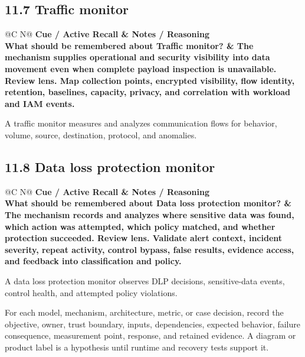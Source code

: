 \documentclass[11pt]{article}
\newcommand{\CornellHeader}{\rowcolor{Navy}\color{white}\bfseries Cue / Active Recall & \color{white}\bfseries Notes / Reasoning \\\endhead}
\newcommand{\CornellRow}[2]{\cellcolor{CueGray}\textbf{#1} & #2 \\\addlinespace[3pt]}
\begin{document}
\subsection{11.7 Traffic monitor}
\begin{longtable}{@{}C N@{}}
\CornellHeader
\CornellRow{What should be remembered about Traffic monitor?}{The mechanism supplies operational and security visibility into data movement even when complete payload inspection is unavailable. \textbf{Review lens.} Map collection points, encrypted visibility, flow identity, retention, baselines, capacity, privacy, and correlation with workload and IAM events.}
\end{longtable}
\begin{sectionsummarybox}
A traffic monitor measures and analyzes communication flows for behavior, volume, source, destination, protocol, and anomalies.
\end{sectionsummarybox}
\subsection{11.8 Data loss protection monitor}
\begin{longtable}{@{}C N@{}}
\CornellHeader
\CornellRow{What should be remembered about Data loss protection monitor?}{The mechanism records and analyzes where sensitive data was found, which action was attempted, which policy matched, and whether protection succeeded. \textbf{Review lens.} Validate alert context, incident severity, repeat activity, control bypass, false results, evidence access, and feedback into classification and policy.}
\end{longtable}
\begin{sectionsummarybox}
A data loss protection monitor observes DLP decisions, sensitive-data events, control health, and attempted policy violations.
\end{sectionsummarybox}
\begin{practicebox}
For each model, mechanism, architecture, metric, or case decision, record the objective, owner, trust boundary, inputs, dependencies, expected behavior, failure consequence, measurement point, response, and retained evidence. A diagram or product label is a hypothesis until runtime and recovery tests support it.
\end{practicebox}
\end{document}
